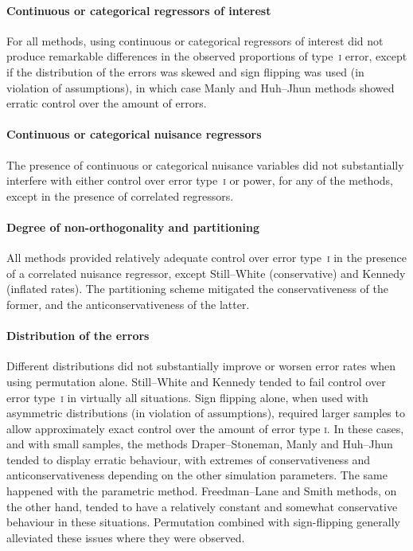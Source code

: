 \paragraph{Continuous or categorical regressors of interest} For all methods, using continuous or categorical regressors of interest did not produce remarkable differences in the observed proportions of type~\textsc{i} error, except if the distribution of the errors was skewed and sign flipping was used (in violation of assumptions), in which case Manly and Huh--Jhun methods showed erratic control over the amount of errors.

\paragraph{Continuous or categorical nuisance regressors} The presence of continuous or categorical nuisance variables did not substantially interfere with either control over error type~\textsc{i} or power, for any of the methods, except in the presence of correlated regressors.

\paragraph{Degree of non-orthogonality and partitioning} All methods provided relatively adequate control over error type~\textsc{i} in the presence of a correlated nuisance regressor, except Still--White (conservative) and Kennedy (inflated rates). The partitioning scheme mitigated the conservativeness of the former, and the anticonservativeness of the latter.

\paragraph{Distribution of the errors} Different distributions did not substantially improve or worsen error rates when using permutation alone. Still--White and Kennedy tended to fail control over error type~\textsc{i} in virtually all situations. Sign flipping alone, when used with asymmetric distributions (in violation of assumptions), required larger samples to allow approximately exact control over the amount of error type \textsc{i}. In these cases, and with small samples, the methods Draper--Stoneman, Manly and Huh--Jhun tended to display erratic behaviour, with extremes of conservativeness and anticonservativeness depending on the other simulation parameters. The same happened with the parametric method. Freedman--Lane and Smith methods, on the other hand, tended to have a relatively constant and somewhat conservative behaviour in these situations. Permutation combined with sign-flipping generally alleviated these issues where they were observed.


